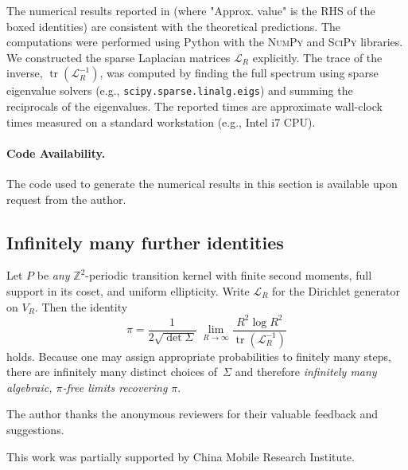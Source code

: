 \documentclass{article}
\numberwithin{equation}{section}
\theoremstyle{definition}
\theoremstyle{remark}
\DeclareMathOperator{\tr}{tr}    %
\begin{document}
The numerical results reported in  (where "Approx. value" is the RHS of the boxed identities) are consistent with the theoretical predictions. The computations were performed using Python with the \textsc{NumPy} and \textsc{SciPy} libraries. We constructed the sparse Laplacian matrices $\mathcal{L}_R$ explicitly. The trace of the inverse, $\tr(\mathcal{L}_R^{-1})$, was computed by finding the full spectrum using sparse eigenvalue solvers (e.g., \texttt{scipy.sparse.linalg.eigs}) and summing the reciprocals of the eigenvalues. The reported times are approximate wall-clock times measured on a standard workstation (e.g., Intel i7 CPU).

\paragraph{Code Availability.} The code used to generate the numerical results in this section is available upon request from the author.


\subsection{Infinitely many further identities}\label{app:infinite}

Let \(P\) be \emph{any} $\mathbb{Z}^{2}$-periodic transition kernel
with finite second moments, full support in its coset, and
uniform ellipticity.
Write \( \mathcal{L}_R \) for the Dirichlet generator on \( V_R \).
Then the identity
\[\pi=\frac{1}{2\sqrt{\det\Sigma}}\;\lim_{R\to\infty}\frac{R^{2}\log R^{2}}{\tr(\mathcal{L}_R^{-1})}\]
holds.
Because one may assign appropriate probabilities to
finitely many steps, there are infinitely many distinct choices of~\(\Sigma\) and therefore
\emph{infinitely many algebraic, $\pi$-free limits recovering $\pi$}.


\begin{ack}
The author thanks the anonymous reviewers for their valuable feedback and suggestions.
\end{ack}

\begin{funding}
This work was partially supported by China Mobile Research Institute.
\end{funding}
\end{document}
